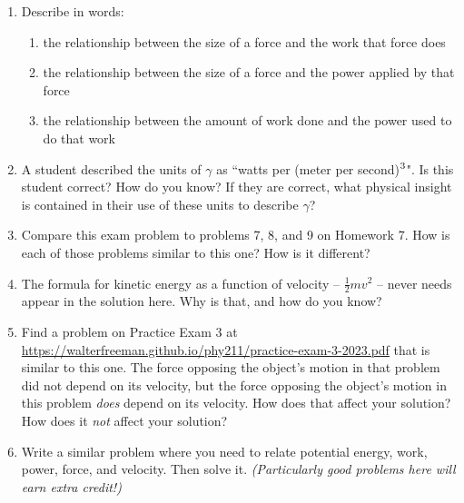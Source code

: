 \documentclass[12pt]{article}
\begin{document}
\begin{enumerate}
	
		\item Describe in words:
		\begin{enumerate}
			\item the relationship between the size of a force and the work that force does
			\item the relationship between the size of a force and the power applied by that force
			\item the relationship between the amount of work done and the power used to do that work
		\end{enumerate}
		
		\item A student described the units of $\gamma$ as ``watts per (meter per second)$\null^3$". Is this student correct? How do you know? If they are correct, what physical insight is contained in their use of these units to describe $\gamma$?
		
		\item Compare this exam problem to problems 7, 8, and 9 on Homework 7. How is each of those problems similar to this one? How is it different?
		
		\item The formula for kinetic energy as a function of velocity -- $\frac{1}{2}mv^2$ -- never needs appear in the solution here. Why is that, and how do you know?
		
		\item Find a problem on Practice Exam 3 at {\url{https://walterfreeman.github.io/phy211/practice-exam-3-2023.pdf}} that is similar to this one. The force opposing the object's motion in that problem did not depend on its velocity, but the force opposing the object's motion in this problem {\it does} depend on its velocity. How does that affect your solution? How does it {\it not} affect your solution?
		
		
    \item Write a similar problem where you need to relate potential energy, work, power, force, and velocity. Then solve it. {\it (Particularly good problems here will earn extra credit!)}
\end{enumerate}
\end{document}
